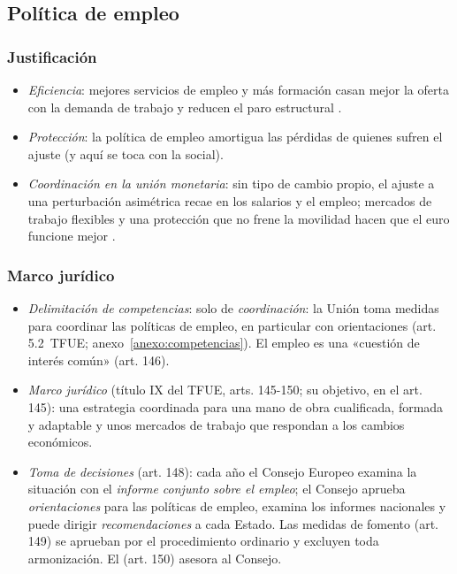 \documentclass[11pt]{article}
\begin{document}
\subsection{Política de empleo}\label{sec:empleo}

\subsubsection{Justificación}

\begin{itemize}
\item \emph{Eficiencia}: mejores servicios de empleo y más formación casan mejor la oferta con la demanda de trabajo y reducen el paro estructural .
\item \emph{Protección}: la política de empleo amortigua las pérdidas de quienes sufren el ajuste (y aquí se toca con la social).
\item \emph{Coordinación en la unión monetaria}: sin tipo de cambio propio, el ajuste a una perturbación asimétrica recae en los salarios y el empleo; mercados de trabajo flexibles y una protección que no frene la movilidad hacen que el euro funcione mejor .
\end{itemize}

\subsubsection{Marco jurídico}

\begin{itemize}
\item \emph{Delimitación de competencias}: solo de \emph{coordinación}: la Unión toma medidas para coordinar las políticas de empleo, en particular con orientaciones (art. 5.2~TFUE; anexo~\ref{anexo:competencias}). El empleo es una «cuestión de interés común» (art. 146).
\item \emph{Marco jurídico} (título IX del TFUE, arts. 145-150; su objetivo, en el art. 145): una estrategia coordinada para una mano de obra cualificada, formada y adaptable y unos mercados de trabajo que respondan a los cambios económicos.
\item \emph{Toma de decisiones} (art. 148): cada año el Consejo Europeo examina la situación con el \emph{informe conjunto sobre el empleo}; el Consejo aprueba \emph{orientaciones} para las políticas de empleo, examina los informes nacionales y puede dirigir \emph{recomendaciones} a cada Estado. Las medidas de fomento (art. 149) se aprueban por el procedimiento ordinario y excluyen toda armonización. El  (art. 150) asesora al Consejo.
\end{itemize}
\end{document}
